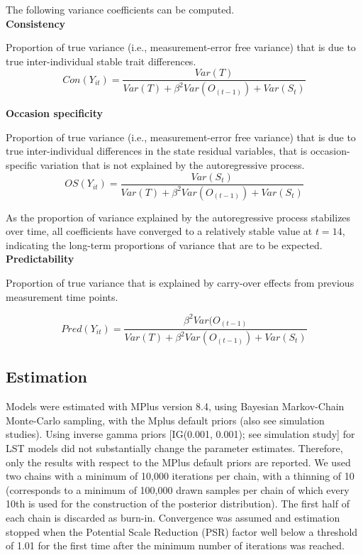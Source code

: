 

The following variance coefficients can be computed. \\

\textbf{Consistency}

Proportion of true variance (i.e., measurement-error free variance) that is due to true inter-individual stable trait differences.
\begin{equation}
Con(Y_{it})=\frac{Var(T)}{Var(T)+\beta^2 Var(O_{(t-1)})+Var(S_t)}
\end{equation}

\textbf{Occasion specificity}

Proportion of true variance (i.e., measurement-error free variance) that is due to true inter-individual differences in the state residual variables, that is occasion-specific variation that is not explained by the autoregressive process.
\begin{equation}
OS(Y_{it}) = \frac{Var(S_t)}{Var(T)+\beta^2 Var(O_{(t-1)})+Var(S_t)}
\end{equation}

As the proportion of variance explained by the autoregressive process stabilizes over time, all coefficients have converged to a relatively stable value at $t=14$, indicating the long-term proportions of variance that are to be expected. \\

\textbf{Predictability}

Proportion of true variance that is explained by carry-over effects from previous measurement time points.

\begin{equation}
Pred(Y_{it}) = \frac{\beta^2 Var(O_{(t-1)}}{Var(T)+\beta^2 Var(O_{(t-1)})+Var(S_t)}
\end{equation}

\subsection{Estimation}\label{estimation}
Models were estimated with MPlus version 8.4, using Bayesian Markov-Chain Monte-Carlo sampling, with the Mplus default priors (also see simulation studies). Using inverse gamma priors [IG(0.001, 0.001); see simulation study] for LST models did not substantially change the parameter estimates. Therefore, only the results with respect to the MPlus default priors are reported.  We used two chains with a minimum of 10,000 iterations per chain, with a thinning of 10 (corresponds to a minimum of 100,000 drawn samples per chain of which every 10th is used for the construction of the posterior distribution). The first half of each chain is discarded as burn-in. Convergence was assumed and estimation stopped when the Potential Scale Reduction (PSR) factor well below a threshold of 1.01 for the first time after the minimum number of iterations was reached.


